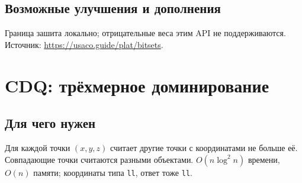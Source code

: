 \subsection*{Возможные улучшения и дополнения}
Граница зашита локально; отрицательные веса этим API не поддерживаются.
Источник: \url{https://usaco.guide/plat/bitsets}.


\fi
\iffalse
\section{CDQ: трёхмерное доминирование}
\subsection*{Для чего нужен}
Для каждой точки $(x,y,z)$ считает другие точки с координатами не больше её.
Совпадающие точки считаются разными объектами. $O(n\log^2 n)$ времени,
$O(n)$ памяти; координаты типа \texttt{ll}, ответ тоже \texttt{ll}.
